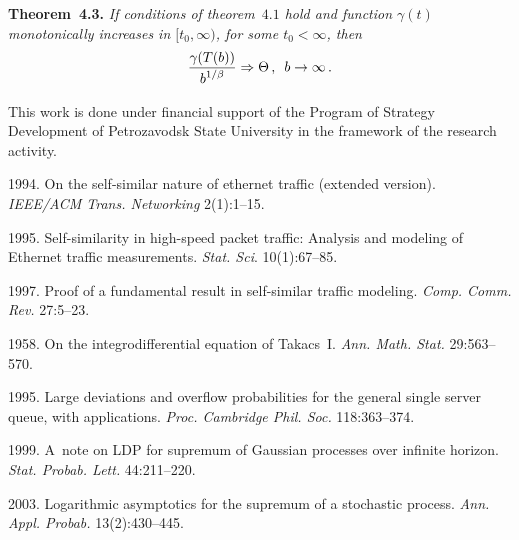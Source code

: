 \begin{multicols}{2}
\noindent
\textbf{Theorem~4.3.}
\textit{If conditions of  theorem~$4.1$ hold and  function
$\gamma(t)$ monotonically increases in  $[t_0,\infty)$, for some
$t_0<\infty$, then}
\begin{equation*}
\displaystyle\frac{\displaystyle \gamma(T(b))\mathstrut}{\displaystyle b^{1/\beta}\mathstrut} \Rightarrow \Theta\,,\enskip b \to \infty\,.
\end{equation*}

\vspace*{-6pt}

\Ack
This work is done under financial   support
of  the Program of Strategy Development of  Petrozavodsk State
University  in the framework
of the research activity.



\renewcommand{\bibname}{\protect\rmfamily References}

{\small\frenchspacing
{%
\begin{thebibliography}{99}

  1994.
On the self-similar nature of ethernet traffic (extended version).
\textit{IEEE/ACM Trans. Networking} 2(1):1--15.

1995. Self-similarity in high-speed packet traffic: Analysis and
modeling of Ethernet traffic measurements. \textit{Stat. Sci}.
10(1):67--85.

 1997. Proof of a
fundamental result in self-similar traffic modeling. \textit{Comp.
Comm. Rev.} 27:5--23.

 1958.
On the integrodifferential equation of Takacs~I.
\textit{Ann. Math. Stat.} 29:563--570.

  1995.
Large deviations and overflow
probabilities for the general single server queue, with
applications. \textit{Proc. Cambridge Phil. Soc.} 118:363--374.

 1999.
A~note on LDP for supremum of Gaussian processes over infinite
horizon. \textit{Stat. Probab. Lett.} 44:211--220.

 2003.
Logarithmic asymptotics for the supremum of a stochastic process.
\textit{Ann. Appl. Probab.} 13(2):430--445.


\end{thebibliography}}}
\end{multicols}
